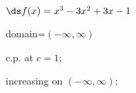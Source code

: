 {$\ds f(x) =x^3-3x^2+3x-1$
}
{domain=$(-\infty,\infty)$

c.p. at $c=1$; 

increasing on $(-\infty,\infty)$;
}

